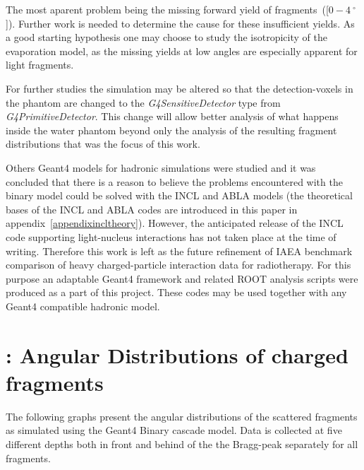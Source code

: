 The most aparent problem being the missing forward yield of fragments~([$0-4~^\circ$]). Further work is needed to determine the cause for these insufficient yields. As a good starting hypothesis one may choose to study the isotropicity of the evaporation model, as the missing yields at low angles are especially apparent for light fragments.

For further studies the simulation may be altered so that the detection-voxels in the phantom are changed to the \textit{G4SensitiveDetector} type from \textit{G4PrimitiveDetector}. This change will allow better analysis of what happens inside the water phantom beyond only the analysis of the resulting fragment distributions that was the focus of this work.

Others Geant4 models for hadronic simulations were studied and it was concluded that there is a reason to believe the problems encountered with the binary model could be solved with the INCL and ABLA models (the theoretical bases of the INCL and ABLA codes are introduced in this paper in appendix~\ref{appendixincltheory}). However, the anticipated release of the INCL code supporting light-nucleus interactions has not taken place at the time of writing. Therefore this work is left as the future refinement of IAEA benchmark comparison of heavy charged-particle interaction data for radiotherapy. For this purpose an adaptable Geant4 framework and related ROOT analysis scripts were produced as a part of this project. These codes may be used together with any Geant4 compatible hadronic model.

\clearpage

  

\appendix 

\clearpage
{}
\section{\label{AppendixA}: Angular Distributions of charged fragments\label{AngularDistributionAppendix}}

The following graphs present the angular distributions of the scattered fragments as simulated using the Geant4 Binary cascade model. Data is collected at five different depths both in front and behind of the the Bragg-peak separately for all fragments.

\renewcommand{\theequation}{A\arabic{equation}}
\setcounter{equation}{0}  
\renewcommand{\thefigure}{A\arabic{figure}}
\setcounter{figure}{0}
\renewcommand{\thetable}{A\arabic{table}}
\setcounter{table}{0}
\renewcommand\thesection{A}
\setcounter{section}{1}

